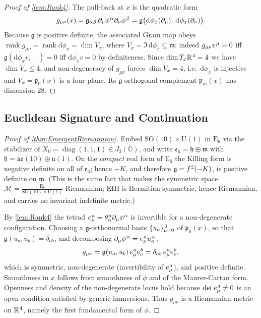 \documentclass[pdflatex,sn-mathphys-num]{sn-jnl}
\theoremstyle{thmstyleone}
\theoremstyle{thmstyletwo}%
\theoremstyle{thmstylethree}%
\newcommand{\SO}[1]{\mathrm{SO(#1)}}
\newcommand{\U}[1]{\mathrm{U(#1)}}
\newcommand{\E}[1]{\mathrm{E_{#1}}}
\newcommand{\M}{\mathcal{M}}
\newcommand{\jalg}{J_3(\mathbb{O})}
\newcommand{\SOTen}{\SO{10}}
\newcommand{\UOne}{\U{1}}
\newcommand{\ESix}{\E{6}}
\newcommand{\SOTenXUOne}{\SOTen \times \UOne}
\newcommand{\MCoset}{\frac{\ESix}{\SOTenXUOne}}
\newcommand{\sm}{\hspace{.065em}}
\newcommand{\smexp}[1]{^{\sm #1}}
\begin{document}
\begin{appendices}
\begin{proof}[Proof of \autoref{lem:Rank4}]
The pull-back at \(x\) is the quadratic form
\[
  g_{\mu\nu}(x)
  =\mathfrak g_{\alpha\beta}\,\partial_\mu\phi\smexp{\alpha}\partial_\nu\phi\smexp{\beta}
  =\mathfrak g\bigl(\mathrm d\sm\phi_x(\partial_\mu),\,
          \mathrm d\sm\phi_x(\partial_\nu)\bigr).
\]
Because \(\mathfrak g\) is positive definite, the associated Gram map obeys
\(\operatorname{rank} g_{\mu\nu}=\operatorname{rank}\mathrm d\phi_x=\dim
V_x\), where \(V_x=\Im\,\mathrm d\phi_x\subseteq\mathfrak m\): indeed
\(g_{\mu\nu}v\smexp{\mu}=0\) iff \(\mathfrak g(\mathrm d\phi_x v,\,\cdot\,)=0\)
iff \(\mathrm d\phi_x v=0\) by definiteness. Since
\(\dim T_x\mathbb R\smexp{4}=4\) we have \(\dim V_x\le4\), and non-degeneracy of
\(g_{\mu\nu}\) forces \(\dim V_x=4\), i.e.\ \(\mathrm d\phi_x\) is injective and
\(V_x=\mathfrak p_{0}(x)\) is a four-plane. Its \(\mathfrak g\)-orthogonal
complement \(\mathfrak p_{m}(x)\) has dimension \(28\).
\end{proof}

\subsection{Euclidean Signature and Continuation}\label{app:Lorentz:Lorentz}

\begin{proof}[Proof of \autoref{thm:EmergentRiemannian}]
Embed \(\SOTenXUOne\) in \(\ESix\) via the stabilizer of
\(X_{0}=\operatorname{diag}(1,1,1)\in\jalg\), and write
\(\mathfrak e_{6}=\mathfrak h\oplus\mathfrak m\) with
\(\mathfrak h=\mathfrak{so}(10)\oplus\mathfrak u(1)\). On the \emph{compact}
real form of \(\ESix\) the Killing form is negative definite on all of
\(\mathfrak e_{6}\); hence \(-K\), and therefore
\(\mathfrak g=f\smexp{2}(-K)\), is positive definite on \(\mathfrak m\). (This
is the same fact that makes the symmetric space
\(\M=\MCoset\) Riemannian; EIII is Hermitian symmetric, hence Riemannian, and
carries no invariant indefinite metric.)

By \autoref{lem:Rank4} the tetrad
\(e_\mu\smexp{a}=\theta\smexp{a}_{\alpha}\partial_\mu\phi\smexp{\alpha}\) is
invertible for a non-degenerate configuration. Choosing a
\(\mathfrak g\)-orthonormal basis \(\{u_a\}_{a=0}\smexp{3}\) of
\(\mathfrak p_{0}(x)\), so that \(\mathfrak g(u_a,u_b)=\delta_{ab}\), and
decomposing \(\partial_\mu\phi\smexp{\alpha}=e_\mu\smexp{a}u_a\smexp{\alpha}\),
\[
  g_{\mu\nu}
  =\mathfrak g(u_a,u_b)\,e_\mu\smexp{a}e_\nu\smexp{b}
  =\delta_{ab}\,e_\mu\smexp{a}e_\nu\smexp{b},
\]
which is symmetric, non-degenerate (invertibility of \(e_\mu\smexp{a}\)), and
positive definite. Smoothness in \(x\) follows from smoothness of \(\phi\) and
of the Maurer-Cartan form. Openness and density of the non-degenerate locus
hold because \(\det e_\mu\smexp{a}\neq0\) is an open condition satisfied by
generic immersions. Thus \(g_{\mu\nu}\) is a Riemannian metric on
\(\mathbb R\smexp{4}\), namely the first fundamental form of \(\phi\).


\end{proof}
\end{appendices}
\end{document}
